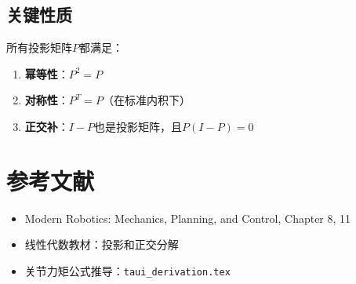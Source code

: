 \documentclass[12pt,a4paper]{article}
\begin{document}
\subsection{关键性质}

所有投影矩阵$P$都满足：
\begin{enumerate}
\item \textbf{幂等性}：$P^2 = P$
\item \textbf{对称性}：$P^T = P$（在标准内积下）
\item \textbf{正交补}：$I - P$也是投影矩阵，且$P(I - P) = 0$
\end{enumerate}

\section{参考文献}

\begin{itemize}
\item Modern Robotics: Mechanics, Planning, and Control, Chapter 8, 11
\item 线性代数教材：投影和正交分解
\item 关节力矩公式推导：\texttt{taui\_derivation.tex}
\end{itemize}
\end{document}
